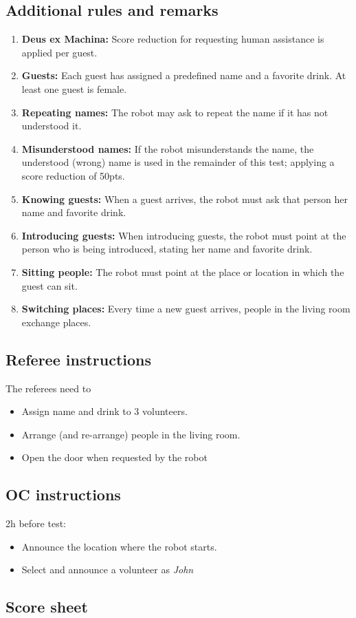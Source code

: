 \subsection*{Additional rules and remarks}
\begin{enumerate}[nosep]
	\item \textbf{Deus ex Machina:} Score reduction for requesting human assistance is applied per guest.

	\item \textbf{Guests:} Each guest has assigned a predefined name and a favorite drink. At least one guest is female.

	\item \textbf{Repeating names:} The robot may ask to repeat the name if it has not understood it.

	\item \textbf{Misunderstood names:} If the robot misunderstands the name, the understood (wrong) name is used in the remainder of this test; applying a score reduction of 50pts.

	\item \textbf{Knowing guests:} When a guest arrives, the robot must ask that person her name and favorite drink.

	\item \textbf{Introducing guests:} When introducing guests, the robot must point at the person who is being introduced, stating her name and favorite drink.

	\item \textbf{Sitting people:} The robot must point at the place or location in which the guest can sit.

	\item \textbf{Switching places:} Every time a new guest arrives, people in the living room exchange places.
\end{enumerate}


\subsection*{Referee instructions}

The referees need to
\begin{itemize}
	\item Assign name and drink to 3 volunteers.
	\item Arrange (and re-arrange) people in the living room.
	\item Open the door when requested by the robot
\end{itemize}

\subsection*{OC instructions}

2h before test:
\begin{itemize}
	\item Announce the location where the robot starts.
	\item Select and announce a volunteer as \emph{John}
\end{itemize}

\subsection*{Score sheet}


